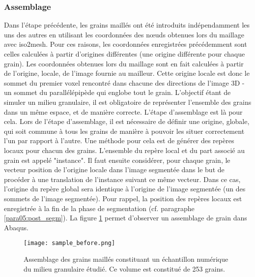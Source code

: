 		\subsubsection{Assemblage}
			Dans l'étape précédente, les grains maillés ont été introduits indépendamment les uns des autres en utilisant les coordonnées des n\oe{}uds obtenues lors du maillage avec iso2mesh. Pour ces raisons, les coordonnées enregistrées précédemment sont celles calculées à partir d'origines différentes (une origine différente pour chaque grain). Les coordonnées obtenues lors du maillage sont en fait calculées à partir de l'origine, locale, de l'image fournie au mailleur. Cette origine locale est donc le sommet du premier voxel rencontré dans chacune des directions de l'image 3D - un sommet du parallélépipède qui englobe tout le grain. L'objectif étant de simuler un milieu granulaire, il est obligatoire de représenter l'ensemble des grains dans un même espace, et de manière correcte. L'étape d'assemblage est là pour cela. Lors de l'étape d'assemblage, il est nécessaire de définir une origine, globale, qui soit commune à tous les grains de manière à pouvoir les situer correctement l'un par rapport à l'autre. Une méthode pour cela est de générer des repères locaux pour chacun des grains. L'ensemble du repère local et du part associé au grain est appelé "instance". Il faut ensuite considérer, pour chaque grain, le vecteur position de l'origine locale dans l'image segmentée dans le but de procéder à une translation de l'instance suivant ce même vecteur. Dans ce cas, l'origine du repère global sera identique à l'origine de l'image segmentée (un des sommets de l'image segmentée). Pour rappel, la position des repères locaux est enregistrée à la fin de la phase de segmentation (cf. paragraphe \ref{para05:post_segm}). La figure \ref{fig05:assemblage_abaqus} permet d'observer un assemblage de grain dans Abaqus.
			\begin{figure}\centering
				\texttt{[image: sample\_before.png]}
				\caption{\label{fig05:assemblage_abaqus}Assemblage des grains maillés constituant un échantillon numérique du milieu granulaire étudié. Ce volume est constitué de \num{253} grains.}
			\end{figure}
